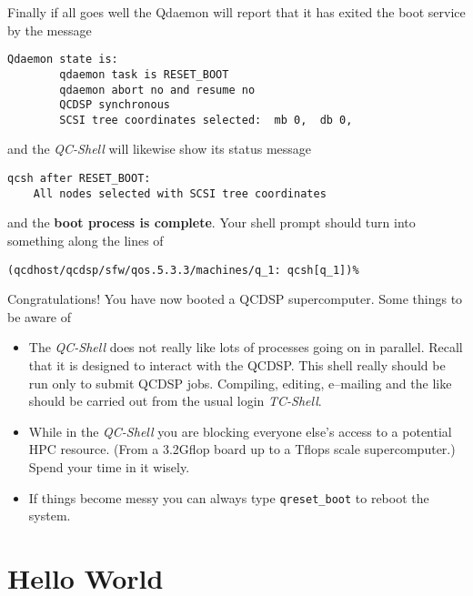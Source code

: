 Finally if all goes well the Qdaemon will report that it has exited
the boot service by the message
\begin{verbatim}
Qdaemon state is:
        qdaemon task is RESET_BOOT
        qdaemon abort no and resume no
        QCDSP synchronous
        SCSI tree coordinates selected:  mb 0,  db 0,  
\end{verbatim}
and the {\em QC-Shell} will likewise show its status message
\begin{verbatim}
qcsh after RESET_BOOT:
	All nodes selected with SCSI tree coordinates
\end{verbatim}
and the {\bf boot process is complete}. Your shell prompt should
turn into something along the lines of 
\begin{verbatim}
(qcdhost/qcdsp/sfw/qos.5.3.3/machines/q_1: qcsh[q_1])% 
\end{verbatim}

Congratulations! You have now booted a QCDSP supercomputer.
Some things to be aware of
\begin{itemize}
\item
The {\em QC-Shell} does not really like lots of processes going on in parallel.
Recall that it is designed to interact with the QCDSP. This shell really
should be run only to submit QCDSP jobs. Compiling, editing, e--mailing
and the like should be carried out from the usual login {\em TC-Shell}.
\item
While in the {\em QC-Shell} you are blocking everyone else's access to a potential
HPC resource. (From a 3.2Gflop board up to a Tflops scale supercomputer.)
Spend your time in it wisely.
\item
If things become messy you can always type {\tt qreset\_boot} to reboot
the system.
\end{itemize}

\section{Hello World} 
